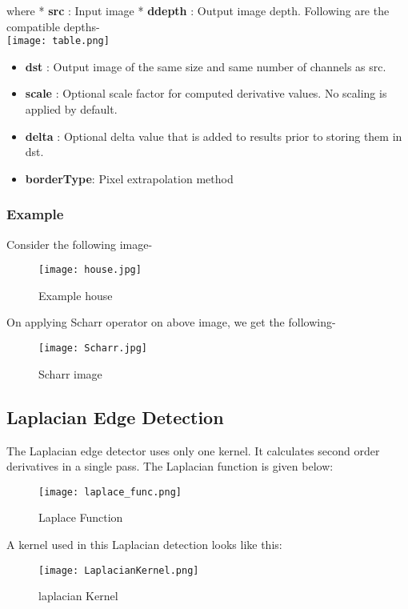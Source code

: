 \documentclass[]{article}
\providecommand{\tightlist}{%
  \setlength{\itemsep}{0pt}\setlength{\parskip}{0pt}}
\begin{document}
where * \textbf{src} : Input image * \textbf{ddepth} : Output image
depth. Following are the compatible depths- \\
\texttt{[image: table.png]}

\begin{itemize}
\tightlist
\item
  \textbf{dst} : Output image of the same size and same number of
  channels as src.
\item
  \textbf{scale} : Optional scale factor for computed derivative values.
  No scaling is applied by default.
\item
  \textbf{delta} : Optional delta value that is added to results prior
  to storing them in dst.
\item
  \textbf{borderType}: Pixel extrapolation method
\end{itemize}

\subsubsection{Example}\label{example}

Consider the following image-

\begin{figure}[htbp]
\centering
\texttt{[image: house.jpg]}
\caption{Example house}
\end{figure}

On applying Scharr operator on above image, we get the following-

\begin{figure}[htbp]
\centering
\texttt{[image: Scharr.jpg]}
\caption{Scharr image}
\end{figure}

\subsection{Laplacian Edge Detection}\label{laplacian-edge-detection}

The Laplacian edge detector uses only one kernel. It calculates second
order derivatives in a single pass. The Laplacian function is given
below:\\
\begin{figure}
\centering
\texttt{[image: laplace\_func.png]}
\caption{Laplace Function}
\end{figure}

A kernel used in this Laplacian detection looks like this:\\
\begin{figure}
\centering
\texttt{[image: LaplacianKernel.png]}
\caption{laplacian Kernel}
\end{figure}
\end{document}
